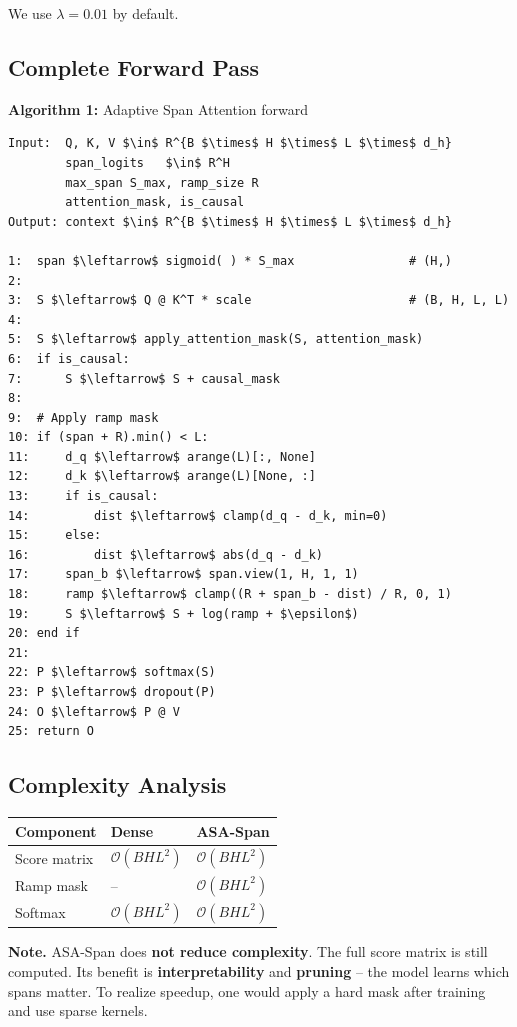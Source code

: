 We use $\lambda = 0.01$ by default.

\subsection{Complete Forward Pass}

\textbf{Algorithm 1:} Adaptive Span Attention forward
\begin{lstlisting}
Input:  Q, K, V $\in$ R^{B $\times$ H $\times$ L $\times$ d_h}
        span_logits   $\in$ R^H
        max_span S_max, ramp_size R
        attention_mask, is_causal
Output: context $\in$ R^{B $\times$ H $\times$ L $\times$ d_h}

1:  span $\leftarrow$ sigmoid( ) * S_max                # (H,)
2:
3:  S $\leftarrow$ Q @ K^T * scale                      # (B, H, L, L)
4:
5:  S $\leftarrow$ apply_attention_mask(S, attention_mask)
6:  if is_causal:
7:      S $\leftarrow$ S + causal_mask
8:
9:  # Apply ramp mask
10: if (span + R).min() < L:
11:     d_q $\leftarrow$ arange(L)[:, None]
12:     d_k $\leftarrow$ arange(L)[None, :]
13:     if is_causal:
14:         dist $\leftarrow$ clamp(d_q - d_k, min=0)
15:     else:
16:         dist $\leftarrow$ abs(d_q - d_k)
17:     span_b $\leftarrow$ span.view(1, H, 1, 1)
18:     ramp $\leftarrow$ clamp((R + span_b - dist) / R, 0, 1)
19:     S $\leftarrow$ S + log(ramp + $\epsilon$)
20: end if
21:
22: P $\leftarrow$ softmax(S)
23: P $\leftarrow$ dropout(P)
24: O $\leftarrow$ P @ V
25: return O
\end{lstlisting}

\subsection{Complexity Analysis}

\begin{table}[H]
\centering
\small
\begin{tabular}{lll}
\toprule
\textbf{Component} & \textbf{Dense} & \textbf{ASA-Span} \\
\midrule
Score matrix & $\mathcal{O}(B H L^2)$ & $\mathcal{O}(B H L^2)$ \\
Ramp mask & -- & $\mathcal{O}(B H L^2)$ \\
Softmax & $\mathcal{O}(B H L^2)$ & $\mathcal{O}(B H L^2)$ \\
\bottomrule
\end{tabular}
\end{table}

\textbf{Note.} ASA-Span does \textbf{not reduce complexity}. The full score matrix is 
still computed. Its benefit is \textbf{interpretability} and \textbf{pruning} -- the 
model learns which spans matter. To realize speedup, one would apply a hard 
mask after training and use sparse kernels.

